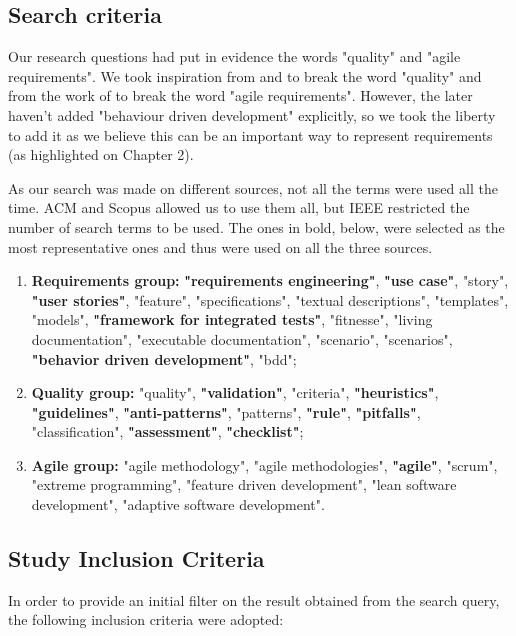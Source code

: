 \subsection{Search criteria}

Our research questions had put in evidence the words "quality" and "agile requirements". We took inspiration from \cite{Tiwari_2015} and \cite{Attar_2012} to break the word "quality" and from the work of \cite{Medeiros_2015} to break the word "agile requirements". However, the later haven't added "behaviour driven development" explicitly, so we took the liberty to add it as we believe this can be an important way to represent requirements (as highlighted on Chapter 2). 

As our search was made on different sources, not all the terms were used all the time. ACM and Scopus allowed us to use them all, but IEEE restricted the number of search terms to be used. The ones in bold, below, were selected as the most representative ones and thus were used on all the three sources. 

\begin{enumerate}
\item \textbf{Requirements group:} \textbf{"requirements engineering"}, \textbf{"use case"}, "story", \textbf{"user stories"}, "feature", "specifications", "textual descriptions", "templates", "models", \textbf{"framework for integrated tests"}, "fitnesse", "living documentation", "executable documentation", "scenario", "scenarios", \textbf{"behavior driven development"}, "bdd";
\item \textbf{Quality group:} "quality", \textbf{"validation"}, "criteria", \textbf{"heuristics"}, \textbf{"guidelines"}, \textbf{"anti-patterns"}, "patterns", \textbf{"rule"}, \textbf{"pitfalls"}, "classification", \textbf{"assessment"}, \textbf{"checklist"};
\item \textbf{Agile group:} "agile methodology", "agile methodologies", \textbf{"agile"}, "scrum", "extreme programming", "feature driven development", "lean software development", "adaptive software development".
\end{enumerate}

\subsection{Study Inclusion Criteria}

In order to provide an initial filter on the result obtained from the search query, the following inclusion criteria were adopted:

